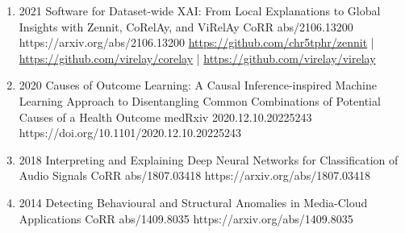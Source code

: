 \documentclass[10pt,a4paper]{article} %
\begin{document}
{\begin{enumerate}
        \item[] 
                            {2021}
                            {Software for Dataset-wide XAI: From Local Explanations to Global Insights with Zennit, CoRelAy, and ViRelAy}
                            {CoRR abs/2106.13200}
                            {https://arxiv.org/abs/2106.13200}
                            {   \href{https://github.com/chr5tphr/zennit}{https://github.com/chr5tphr/zennit} | \\
                                \href{https://github.com/virelay/corelay}{https://github.com/virelay/corelay} |
                                \href{https://github.com/virelay/virelay}{https://github.com/virelay/virelay}
                            }

        \item[] 
                            {2020}
                            {Causes of Outcome Learning: A Causal Inference-inspired Machine Learning Approach to Disentangling Common Combinations of Potential Causes of a Health Outcome}
                            {medRxiv 2020.12.10.20225243}
                            {https://doi.org/10.1101/2020.12.10.20225243}

        \item[] 
                            {2018}
                            {Interpreting and Explaining Deep Neural Networks for Classification of Audio Signals}
                            {CoRR abs/1807.03418}
                            {https://arxiv.org/abs/1807.03418}

        \item[] 
                            {2014}
                            {Detecting Behavioural and Structural Anomalies in Media-Cloud Applications}
                            {CoRR abs/1409.8035}
                            {https://arxiv.org/abs/1409.8035}

    \end{enumerate}

}
\end{document}
